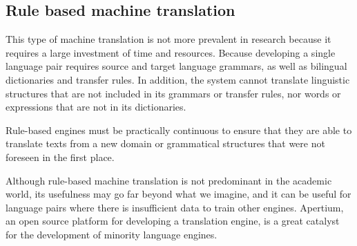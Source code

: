 \documentclass[a4paper]{article}
\theoremstyle{plain}
\theoremstyle{definition}
\begin{document}
    \subsection{Rule based machine translation}
    This type of machine translation is not more prevalent in research because it requires a large investment of time and resources. Because developing a single language pair requires source and target language grammars, as well as bilingual dictionaries and transfer rules. In addition, the system cannot translate linguistic structures that are not included in its grammars or transfer rules, nor words or expressions that are not in its dictionaries.\newline

    Rule-based engines must be practically continuous to ensure that they are able to translate texts from a new domain or grammatical structures that were not foreseen in the first place. \newline

    Although rule-based machine translation is not predominant in the academic world, its usefulness may go far beyond what we imagine, and it can be useful for language pairs where there is insufficient data to train other engines. Apertium, an open source platform for developing a translation engine, is a great catalyst for the development of minority language engines.\newline
\end{document}

